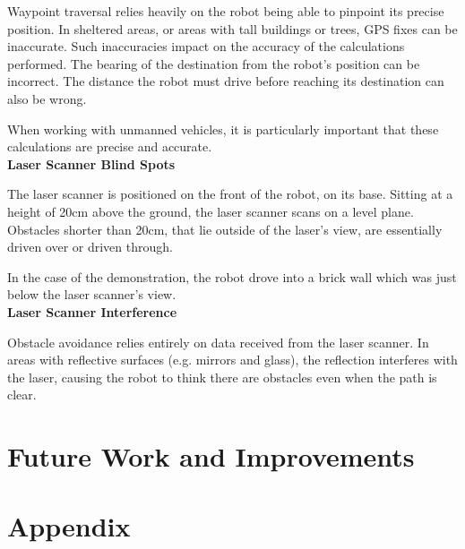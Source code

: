 \documentclass[titlepage,12pt,a4paper]{article}
\begin{document}
Waypoint traversal relies heavily on the robot being able to pinpoint its precise position. In sheltered areas, or areas with tall buildings or trees, GPS fixes can be inaccurate. Such inaccuracies impact on the accuracy of the calculations performed. The bearing of the destination from the robot's position can be incorrect. The distance the robot must drive before reaching its destination can also be wrong. 

When working with unmanned vehicles, it is particularly important that these calculations are precise and accurate. \\

\textbf{Laser Scanner Blind Spots}

The laser scanner is positioned on the front of the robot, on its base. Sitting at a height of 20cm above the ground, the laser scanner scans on a level plane. Obstacles shorter than 20cm, that lie outside of the laser's view, are essentially driven over or driven through. 

In the case of the demonstration, the robot drove into a brick wall which was just below the laser scanner's view. \\

\textbf{Laser Scanner Interference}

Obstacle avoidance relies entirely on data received from the laser scanner. In areas with reflective surfaces (e.g. mirrors and glass), the reflection interferes with the laser, causing the robot to think there are obstacles even when the path is clear.

\pagebreak
\section{Future Work and Improvements}

\pagebreak
\section{Appendix}
\end{document}
